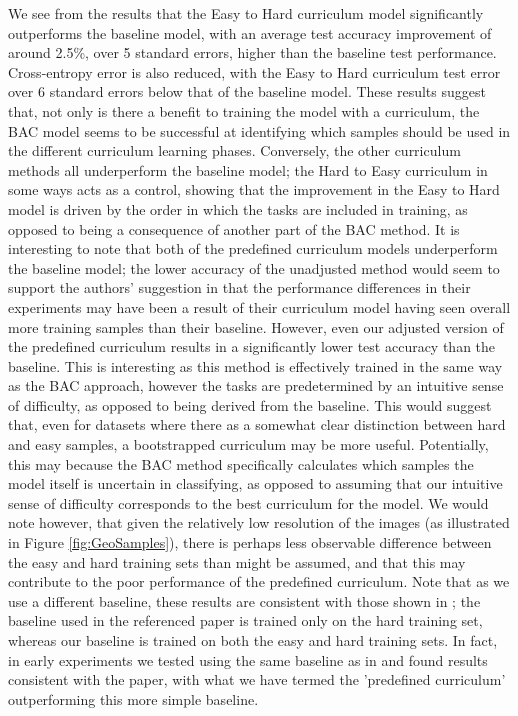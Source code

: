 We see from the results that the Easy to Hard curriculum model significantly outperforms the baseline model, with an average test accuracy improvement of around 2.5\%, over 5 standard errors, higher than the baseline test performance.  Cross-entropy error is also reduced, with the Easy to Hard curriculum test error over 6 standard errors below that of the baseline model. These results suggest that, not only is there a benefit to training the model with a curriculum, the BAC model seems to be successful at identifying which samples should be used in the different curriculum learning phases. Conversely, the other curriculum methods all underperform the baseline model; the Hard to Easy curriculum in some ways acts as a control, showing that the improvement in the Easy to Hard model is driven by the order in which the tasks are included in training, as opposed to being a consequence of another part of the BAC method. It is interesting to note that both of the predefined curriculum models underperform the baseline model; the lower accuracy of the unadjusted method would seem to support the authors' suggestion in  \cite{Bengio2009} that the performance differences in their experiments may have been a result of their curriculum model having seen overall more training samples than their baseline. However, even our adjusted version of the predefined curriculum results in a significantly lower test accuracy than the baseline. This is interesting as this method is effectively trained in the same way as the BAC approach, however the tasks are predetermined by an intuitive sense of difficulty, as opposed to being derived from the baseline. This would suggest that, even for datasets where there as a somewhat clear distinction between hard and easy samples, a bootstrapped curriculum may be more useful. Potentially, this may because the BAC method specifically calculates which samples the model itself is uncertain in classifying, as opposed to assuming that our intuitive sense of difficulty corresponds to the best curriculum for the model. We would note however, that given the relatively low resolution of the images (as illustrated in Figure \ref{fig:GeoSamples}), there is perhaps less observable difference between the easy and hard training sets than might be assumed, and that this may contribute to the poor performance of the predefined curriculum. Note that as we use a different baseline, these results are consistent with those shown in \cite{Bengio2009}; the baseline used in the referenced paper is trained only on the hard training set, whereas our baseline is trained on both the easy and hard training sets. In fact, in early experiments we tested using the same baseline as in \cite{Bengio2009} and found results consistent with the paper, with what we have termed the 'predefined curriculum' outperforming this more simple baseline.

